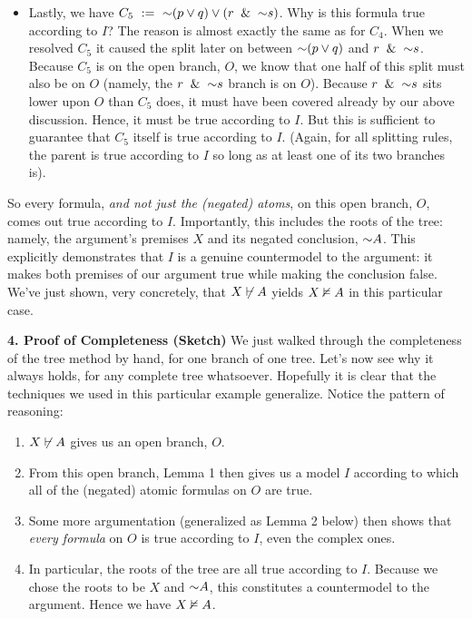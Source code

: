 \documentclass[options]{philosophersimprint}
\begin{document}
\begin{itemize}
    \item Lastly, we have $C_5 \ := \ \mathord{\sim}(p\mathbin{\vee} q)\mathbin{\vee}(r\ \mathbin{\&} \ \mathord{\sim} s)$. Why is this formula true according to $I$? The reason is almost exactly the same as for $C_4$. When we resolved $C_5$ it caused the split later on between $\mathord{\sim}(p\mathbin{\vee} q)$ and $r\ \mathbin{\&} \ \mathord{\sim} s$. Because $C_5$ is on the open branch, $O$, we know that one half of this split must also be on $O$ (namely, the $r\ \mathbin{\&} \ \mathord{\sim} s$ branch is on $O$). Because $r\ \mathbin{\&} \ \mathord{\sim} s$ sits lower upon $O$ than $C_5$ does, it must have been covered already by our above discussion. Hence, it must be true according to $I$. But this is sufficient to guarantee that $C_5$ itself is true according to $I$. (Again, for all splitting rules, the parent is true according to $I$ so long as at least one of its two branches is).
\end{itemize}

So every formula, \textit{and not just the (negated) atoms}, on this open branch, $O$, comes out true according to $I$. Importantly, this includes the roots of the tree: namely, the argument's premises $X$ and its negated conclusion, $\mathord{\sim} A$. This explicitly demonstrates that $I$ is a genuine countermodel to the argument: it makes both premises of our argument true while making the conclusion false. We've just shown, very concretely, that $X \not\vdash A$ yields $X \nvDash A$ in this particular case.

\textbf{4. Proof of Completeness (Sketch)} We just walked through the completeness of the tree method by hand, for one branch of one tree. Let's now see why it always holds, for any complete tree whatsoever. Hopefully it is clear that the techniques we used in this particular example generalize. Notice the pattern of reasoning:
\begin{enumerate}
    \item $X \not\vdash A$ gives us an open branch, $O$.
    \item From this open branch, Lemma 1 then gives us a model $I$ according to which all of the (negated) atomic formulas on $O$ are true.
    \item Some more argumentation (generalized as Lemma 2 below) then shows that \textit{every formula} on $O$ is true according to $I$, even the complex ones.
    \item In particular, the roots of the tree are all true according to $I$. Because we chose the roots to be $X$ and $\mathord{\sim} A$, this constitutes a countermodel to the argument. Hence we have $X \nvDash A$.
\end{enumerate}
\end{document}
